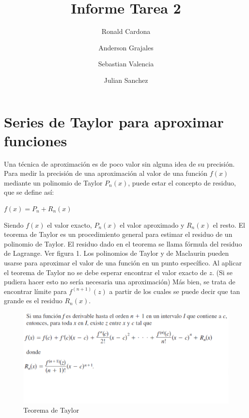 \documentclass[12pt]{article}
\title{Informe Tarea 2}
\author {Ronald Cardona
\and Anderson Grajales
\and Sebastian Valencia
\and Julian Sanchez}
\begin{document}
    
    \maketitle
    \section{Series de Taylor para aproximar funciones}
    Una técnica de aproximación es de poco valor sin alguna idea de su precisión.
    Para medir la precisión de una aproximación al valor de una función $f(x)$ mediante 
    un polinomio de Taylor $P_{n}(x)$, puede estar el concepto de residuo, que se define así:

    \begin{center}
        \begin{math}
            f(x) = P_{n} + R_{n}(x)
        \end{math}
    \end{center}

    Siendo $f(x)$ el valor exacto, $P_{n}(x)$ el valor aproximado y $R_{n}(x)$ el resto. El teorema
    de Taylor es un procedimiento general para estimar el residuo de un polinomio de Taylor. El residuo
    dado en el teorema se llama fórmula del residuo de Lagrange. Ver figura 1.
    Los polinomios de Taylor y de Maclaurin pueden usarse para aproximar el valor de una función en un
    punto específico. Al aplicar el teorema de Taylor no se debe esperar encontrar el valor exacto de $z$.
    (Si se pudiera hacer esto no sería necesaria una aproximación) Más bien, se trata de encontrar límite
    para $f^{(n+1)}(z)$ a partir de los cuales se puede decir que tan grande es el residuo $R_{n}(x)$.
    \begin {figure}[h!] 
      \includegraphics[width=\linewidth]{teorema_taylor.png}
      \caption {Teorema de Taylor}
      \label {fig:teorema_taylor}
    \end{figure}
    
    
    
\end{document}
